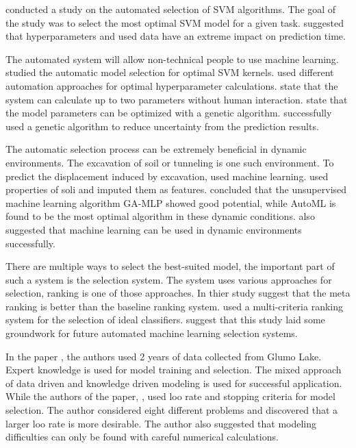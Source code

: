 \cite{ref_paper_2} conducted a study on the automated selection of SVM algorithms. The goal of the study was to select the most optimal SVM model for a given task. \cite{ref_paper_2} suggested that hyperparameters and used data have an extreme impact on prediction time.

The automated system will allow non-technical people to use machine learning. \cite{ref_paper_3} studied the automatic model selection for optimal SVM kernels. \cite{ref_paper_3} used different automation approaches for optimal hyperparameter calculations. \cite{ref_paper_3} state that the system can calculate up to two parameters without human interaction. \cite{ref_paper_39} state that the model parameters can be optimized with a genetic algorithm. \cite{ref_paper_39} successfully used a genetic algorithm to reduce uncertainty from the prediction results.

The automatic selection process can be extremely beneficial in dynamic environments. The excavation of soil or tunneling is one such environment. To predict the displacement induced by excavation, \cite{ref_paper_1} used machine learning. \cite{ref_paper_1} used properties of soli and imputed them as features. \cite{ref_paper_1} concluded that the unsupervised machine learning algorithm GA-MLP showed good potential, while AutoML is found to be the most optimal algorithm in these dynamic conditions. \cite{ref_paper_13} also suggested that machine learning can be used in dynamic environments successfully.

There are multiple ways to select the best-suited model, the important part of such a system is the selection system. The system uses various approaches for selection, ranking is one of those approaches. In thier study \cite{ref_paper_23} suggest that the meta ranking is better than the baseline ranking system. \cite{ref_paper_23} used a multi-criteria ranking system for the selection of ideal classifiers. \cite{ref_paper_23} suggest that this study laid some groundwork for future automated machine learning selection systems.

In the paper \cite{ref_paper_43}, the authors used 2 years of data collected from Glumo Lake. Expert knowledge is used for model training and selection. The mixed approach of data driven and knowledge driven modeling is used for successful application. While the authors of the paper, \cite{ref_paper_2}, used loo rate and stopping criteria for model selection. The author considered eight different problems and discovered that a larger loo rate is more desirable. The author also suggested that modeling difficulties can only be found with careful numerical calculations.

